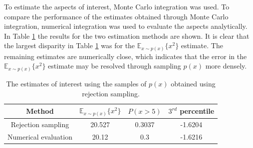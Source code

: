 \documentclass{article}
\begin{document}
	To estimate the aspects of interest, Monte Carlo integration was used. To compare the performance of the estimates obtained through Monte Carlo integration, numerical integration was used to evaluate the aspects analytically. In Table \ref{tab:Q1_estimates} the results for the two estimation methods are shown. It is clear that the largest disparity in Table \ref{tab:Q1_estimates} was for the $\mathbb{E}_{x \sim p(x)} \{ x^2 \}$ estimate. The remaining estimates are numerically close, which indicates that the error in the $\mathbb{E}_{x \sim p(x)} \{ x^2 \}$ estimate may be resolved through sampling $p(x)$ more densely.
	\begin{table}[htb!]
		\centering
		\caption{The estimates of interest using the samples of $p(x)$ obtained using rejection sampling.}
		\label{tab:Q1_estimates}
		\begin{tabular}{@{}cccc@{}}
			\toprule
			Method               & $\mathbb{E}_{x \sim p(x)} \{x^2\}$ & $P(x > 5)$ & $3^{rd}$ percentile \\ \midrule
			Rejection sampling   & 20.527                            & 0.3037     & -1.6204         \\
			Numerical evaluation & 20.12                              & 0.3        & -1.6216        \\ \bottomrule
		\end{tabular}
	\end{table}
\end{document}
